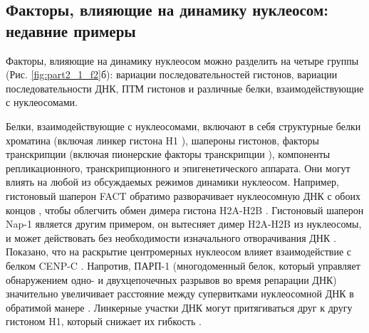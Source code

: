 \subsection{Факторы, влияющие на динамику нуклеосом: недавние примеры}

    Факторы, влияющие на динамику нуклеосом можно разделить на четыре группы (Рис. \ref{fig:part2_1_f2}б): вариации последовательностей гистонов, вариации последовательности ДНК, ПТМ гистонов и различные белки, взаимодействующие с нуклеосомами.

     Белки, взаимодействующие с  нуклеосомами, включают в себя структурные белки хроматина (включая линкер гистона H1 \cite{lyubitelev_structure_2016}), шапероны гистонов, факторы транскрипции (включая пионерские факторы транскрипции \cite{zaret_pioneer_2016}), компоненты репликационного, транскрипционного и эпигенетического аппарата. Они могут влиять на любой из обсуждаемых режимов динамики нуклеосом. Например, гистоновый шаперон FACT обратимо разворачивает нуклеосомную ДНК с обоих концов \cite{valieva_large-scale_2016}, чтобы облегчить обмен димера гистона H2A-H2B \cite{wang_histone_2018}. Гистоновый шаперон Nap-1 является другим примером, он вытесняет димер H2A-H2B из нуклеосомы, и может действовать без необходимости изначального отворачивания ДНК \cite{lee_single-molecule_2017}. Показано, что на раскрытие центромерных нуклеосом влияет взаимодействие с белком CENP-C \cite{falk_cenp-c_2015}. Напротив, ПАРП-1 (многодоменный белок, который управляет обнаружением одно- и двухцепочечных разрывов во время репарации ДНК) значительно увеличивает расстояние между супервитками нуклеосомной ДНК в обратимой манере \cite{sultanov_unfolding_2017}. Линкерные участки ДНК могут притягиваться друг к другу гистоном H1, который снижает их гибкость \cite{bednar_structure_2017}.

